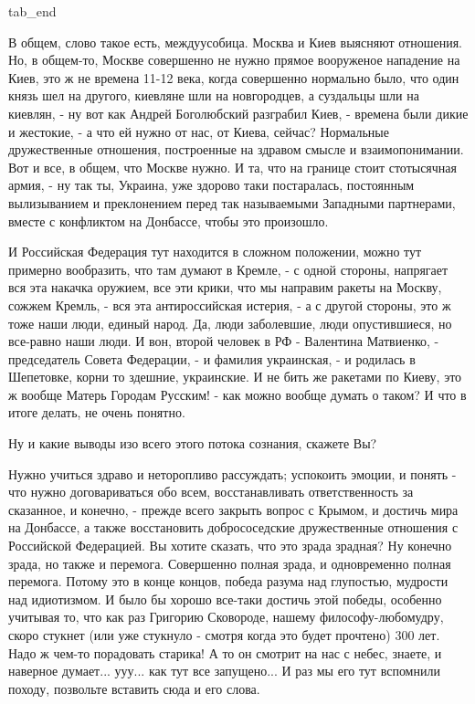   tab_end
\fi

В общем, слово такое есть, междуусобица.  Москва и Киев выясняют отношения. Но,
в общем-то, Москве совершенно не нужно прямое вооруженое нападение на Киев, это
ж не времена 11-12 века, когда совершенно нормально было, что один князь шел на
другого, киевляне шли на новгородцев, а суздальцы шли на киевлян, - ну вот как
Андрей Боголюбский разграбил Киев, - времена были дикие и жестокие, - а что ей
нужно от нас, от Киева, сейчас?  Нормальные дружественные отношения,
построенные на здравом смысле и взаимопонимании. Вот и все, в общем, что Москве
нужно. И та, что на границе стоит стотысячная армия, - ну так ты, Украина, уже
здорово таки постаралась, постоянным вылизыванием и преклонением перед так
называемыми Западными партнерами, вместе с конфликтом на Донбассе, чтобы это
произошло.

И Российская Федерация тут находится в сложном положении, можно тут примерно
вообразить, что там думают в Кремле, - с одной стороны, напрягает вся эта
накачка оружием, все эти крики, что мы направим ракеты на Москву, сожжем
Кремль, - вся эта антироссийская истерия, - а с другой стороны, это ж тоже наши
люди, единый народ. Да, люди заболевшие, люди опустившиеся, но все-равно наши
люди.  И вон, второй человек в РФ - Валентина Матвиенко, - председатель Совета
Федерации, - и фамилия украинская, - и родилась в Шепетовке, корни то здешние,
украинские. И не бить же ракетами по Киеву, это ж вообще Матерь Городам
Русским! - как можно вообще думать о таком? И что в итоге делать, не очень
понятно.

Ну и какие выводы изо всего этого потока сознания, скажете Вы? 

Нужно учиться здраво и неторопливо рассуждать; успокоить эмоции, и понять - что
нужно договариваться обо всем, восстанавливать ответственность за сказанное, и
конечно, - прежде всего закрыть вопрос с Крымом, и достичь мира на Донбассе, а
также восстановить добрососедские дружественные отношения с Российской
Федерацией. Вы хотите сказать, что это зрада зрадная? Ну конечно зрада, но
также и перемога. Совершенно полная зрада, и одновременно полная перемога.
Потому это в конце концов, победа разума над глупостью, мудрости над
идиотизмом. И было бы хорошо все-таки достичь этой победы, особенно учитывая
то, что как раз Григорию Сковороде, нашему философу-любомудру, скоро стукнет
(или уже стукнуло - смотря когда это будет прочтено) 300 лет. Надо ж чем-то
порадовать старика! А то он смотрит на нас с небес, знаете, и наверное
думает...  ууу...  как тут все запущено... И раз мы его тут вспомнили походу,
позвольте вставить сюда и его слова. 

